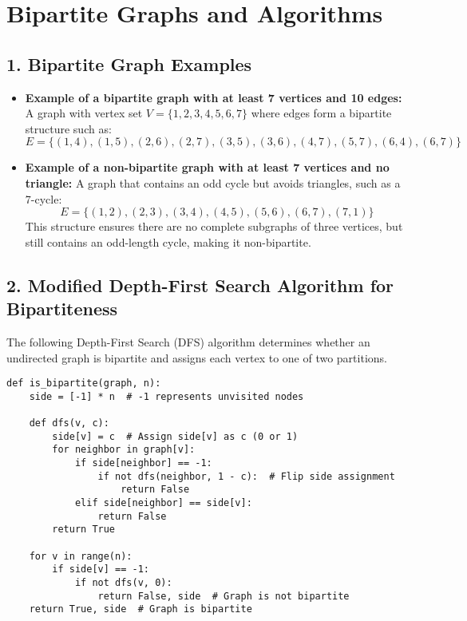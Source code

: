 \documentclass[12pt]{article}
\begin{document}
\renewcommand{\familydefault}{\rmdefault}



\section*{Bipartite Graphs and Algorithms}

\subsection*{1. Bipartite Graph Examples}
\begin{itemize}
    \item \textbf{Example of a bipartite graph with at least 7 vertices and 10 edges:} A graph with vertex set \( V = \{1,2,3,4,5,6,7\} \) where edges form a bipartite structure such as:
    \[
    E = \{(1,4), (1,5), (2,6), (2,7), (3,5), (3,6), (4,7), (5,7), (6,4), (6,7)\}
    \]
    \item \textbf{Example of a non-bipartite graph with at least 7 vertices and no triangle:} A graph that contains an odd cycle but avoids triangles, such as a 7-cycle:
    \[
    E = \{(1,2), (2,3), (3,4), (4,5), (5,6), (6,7), (7,1)\}
    \]
    This structure ensures there are no complete subgraphs of three vertices, but still contains an odd-length cycle, making it non-bipartite.
\end{itemize}

\subsection*{2. Modified Depth-First Search Algorithm for Bipartiteness}
The following Depth-First Search (DFS) algorithm determines whether an undirected graph is bipartite and assigns each vertex to one of two partitions.

\begin{lstlisting}
def is_bipartite(graph, n):
    side = [-1] * n  # -1 represents unvisited nodes
    
    def dfs(v, c):
        side[v] = c  # Assign side[v] as c (0 or 1)
        for neighbor in graph[v]:
            if side[neighbor] == -1:
                if not dfs(neighbor, 1 - c):  # Flip side assignment
                    return False
            elif side[neighbor] == side[v]:
                return False
        return True

    for v in range(n):
        if side[v] == -1:
            if not dfs(v, 0):
                return False, side  # Graph is not bipartite
    return True, side  # Graph is bipartite
\end{lstlisting}
\end{document}
